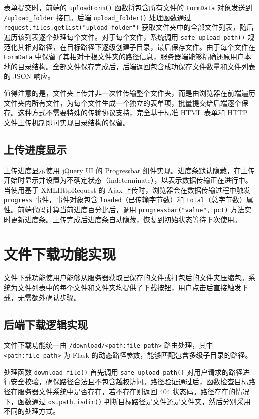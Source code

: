 \documentclass[UTF8,zihao=-4]{ctexrep}
\begin{document}
表单提交时，前端的 \texttt{uploadForm()} 函数将包含所有文件的 \texttt{FormData} 对象发送到 \texttt{/upload\_folder} 接口。后端 \texttt{upload\_folder()} 处理函数通过 \texttt{request.files.getlist("upload\_folder")} 获取文件夹中的全部文件列表，随后遍历该列表逐个处理每个文件。对于每个文件，系统调用 \texttt{safe\_upload\_path()} 规范化其相对路径，在目标路径下逐级创建子目录，最后保存文件。由于每个文件在 \texttt{FormData} 中保留了其相对于根文件夹的路径信息，服务器端能够精确还原用户本地的目录结构。全部文件保存完成后，后端返回包含成功保存文件数量和文件列表的 JSON 响应。

值得注意的是，文件夹上传并非一次性传输整个文件夹，而是由浏览器在前端遍历文件夹内所有文件，为每个文件生成一个独立的表单项，批量提交给后端逐个保存。这种方式不需要特殊的传输协议支持，完全基于标准 HTML 表单和 HTTP 文件上传机制即可实现目录结构的保留。

\subsection{上传进度显示}

上传进度显示使用 jQuery UI 的 Progressbar 组件实现。进度条默认隐藏，在上传开始时显示并设置为不确定状态（indeterminate），以表示数据传输正在进行中。当使用基于 XMLHttpRequest 的 Ajax 上传时，浏览器会在数据传输过程中触发 \texttt{progress} 事件，事件对象包含 \texttt{loaded}（已传输字节数）和 \texttt{total}（总字节数）属性。前端代码计算当前进度百分比后，调用 \texttt{progressbar("value", pct)} 方法实时更新进度条。上传完成后进度条自动隐藏，恢复到初始状态等待下次使用。


\section{文件下载功能实现}

文件下载功能使用户能够从服务器获取已保存的文件或打包后的文件夹压缩包。系统为文件列表中的每个文件和文件夹均提供了下载按钮，用户点击后直接触发下载，无需额外确认步骤。

\subsection{后端下载逻辑实现}

文件下载功能统一由 \texttt{/download/<path:file\_path>} 路由处理，其中 \texttt{<path:file\_path>} 为 Flask 的动态路径参数，能够匹配包含多级子目录的路径。

处理函数 \texttt{download\_file()} 首先调用 \texttt{safe\_upload\_path()} 对用户请求的路径进行安全校验，确保路径合法且不包含越权访问。路径验证通过后，函数检查目标路径在服务器文件系统中是否存在，若不存在则返回 404 状态码。路径存在的情况下，函数通过 \texttt{os.path.isdir()} 判断目标路径是文件还是文件夹，然后分别采用不同的处理方式。
\end{document}
